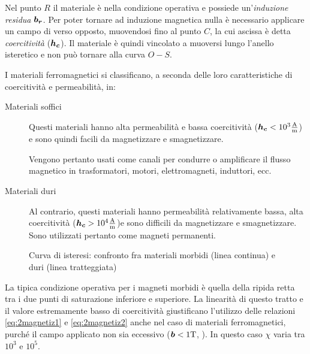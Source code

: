 Nel punto $R$ il materiale è nella condizione operativa e possiede un'\textit{induzione residua} $\boldsymbol{b_r}$. 
Per poter tornare ad induzione magnetica nulla è necessario applicare un campo di verso opposto, muovendosi fino al punto $C$, la cui ascissa è detta \textit{coercitività} ($\boldsymbol{h_c}$).  Il materiale è quindi vincolato a muoversi lungo l'anello isteretico e non può tornare alla curva $O-S$.

I materiali ferromagnetici si classificano, a seconda delle loro caratteristiche di coercitività e permeabilità, in:
\begin{description}
\item[Materiali soffici] Questi materiali hanno alta permeabilità e bassa coercitività ($\boldsymbol{h_c}<10^3 \frac{\text{A}}{\text{m}}$) e sono quindi facili da magnetizzare e smagnetizzare. 

Vengono pertanto usati come canali per condurre o amplificare il flusso magnetico in trasformatori, motori, elettromagneti, induttori, ecc.
\item[Materiali duri] Al contrario, questi materiali hanno permeabilità relativamente bassa, alta coercitività ($\boldsymbol{h_c}>10^4 \frac{\text{A}}{\text{m}}$)e sono difficili da magnetizzare e smagnetizzare. Sono utilizzati pertanto come magneti permanenti.
\end{description}

\begin{figure}[htb]
\centering
\caption{Curva di isteresi: confronto fra materiali morbidi (linea continua) e duri (linea tratteggiata)}
\label{fig:2.6}
\end{figure}

La tipica condizione operativa per i magneti morbidi è quella della ripida retta tra i due punti di saturazione inferiore e superiore. La linearità di questo tratto  e il valore estremamente basso di coercitività giustificano l'utilizzo delle relazioni \eqref{eq:2magnetiz1} e \eqref{eq:2magnetiz2} anche nel caso di materiali ferromagnetici, purché il campo applicato non sia eccessivo ($\boldsymbol{b}< 1 \text{T}$, \citep{bossavit_computational_1998}). 
In questo caso $\chi$ varia tra $10^{3}$ e $10^{5}$.

